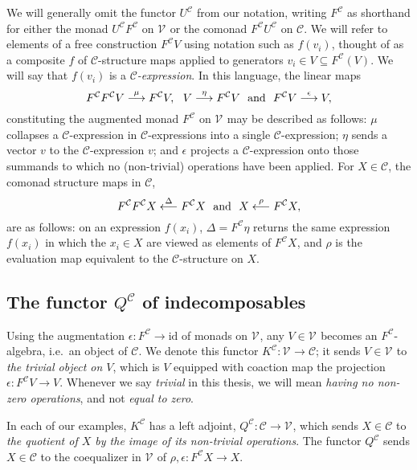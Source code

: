 \documentclass[11pt]{amsart} \renewcommand{\baselinestretch}{1.2}
\theoremstyle{plain}
\numberwithin{equation}{section} %
\theoremstyle{plain}
\numberwithin{equation}{chapter} %
\renewcommand{\to}{\longrightarrow}
\newcommand{\from}{\longleftarrow}
\newcommand{\calV}{\mathcal{V}}
\newcommand{\calc}{\mathcal{C}}
\newcommand{\vect}[2]{\calV^{#1}_{#2}}
\newcommand{\Id}{\mathrm{id}}
\newcommand{\SubsectionOrSection}[1]{\subsection{#1}}
\begin{document}
\begin{Conventions and notation}
We will generally omit the functor $U^{\calc}$ from our notation, writing $F^{\calc}$ as shorthand for either the monad $U^{\calc}F^{\calc}$ on $\vect{}{}$ or the comonad $F^{\calc}U^{\calc}$ on $\calc$. We will refer to elements of a free construction $F^\calc V$ using notation such as $f(v_i)$, thought of as a composite $f$ of $\calc$-structure maps applied to generators $v_i\in V\subseteq F^\calc(V)$. We will say that $f(v_i)$ is a \emph{$\calc$-expression}. In this language, the linear maps %
\[F^\calc F^\calc V\overset{\mu}{\to} F^\calc V,\ \ V\overset{\eta}{\to}F^\calc V\ \ \textup{and}\ \ F^\calc V\overset{\epsilon}{\to}V, \]
constituting the augmented monad $F^\calc $ on $\vect{}{}$ may be described as follows: $\mu$ collapses a $\calc$-expression  in $\calc$-expressions into a single $\calc$-expression; $\eta$ sends a vector $v$ to the $\calc$-expression $v$; and $\epsilon$ projects a $\calc$-expression onto those summands to which no (non-trivial) operations have been applied.
For $X\in \calc$, the comonad structure maps in $\calc$,
\[F^\calc F^\calc X\overset{\Delta}{\from} F^\calc X\ \ \textup{and}\ \ X\overset{\rho}{\from}F^\calc X,\]
are as follows: on an expression $f(x_i)$, $\Delta=F^{\calc}\eta$ returns the same expression $f(x_i)$ in which the $x_i\in X$ are viewed as elements of $F^\calc X$, and $\rho$ is the evaluation map equivalent to the $\calc$-structure on $X$.

\SubsectionOrSection{The functor $Q^\calc$ of indecomposables}
Using the augmentation $\epsilon:F^\calc\to\Id$ of monads on $\vect{}{}$, any $V\in\vect{}{}$ becomes an $F^\calc $-algebra, i.e.\ an object of $\calc$. We denote this functor $K^\calc:\vect{}{}\to \calc$; it sends $V\in\vect{}{}$ to \emph{the trivial object on $V$}, which is $V$ equipped with coaction map the projection $\epsilon:F^{\calc}V\to V$. Whenever we say \emph{trivial} in this thesis, we will mean \emph{having no non-zero operations}, and not \emph{equal to zero}.

In each of our examples,  $K^{\calc}$ has a left adjoint, $Q^{\calc}:\calc\to\vect{}{}$, which sends $X\in\calc$ to \emph{the quotient of $X$ by the image of its non-trivial operations}. %
The functor $Q^{\calc}$ sends $X\in \calc$ to the coequalizer in $\vect{}{}$ of $\rho,\epsilon:F^\calc X\to X$.


\end{Conventions and notation}
\end{document}

